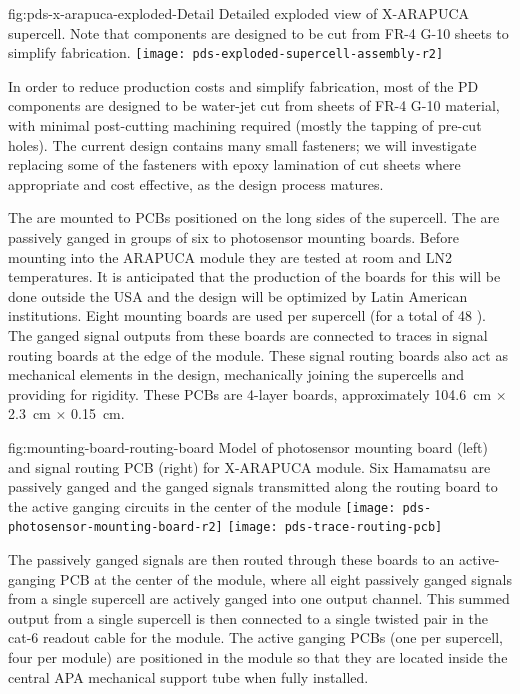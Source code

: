 
\begin{dunefigure}{fig:pds-x-arapuca-exploded-Detail}
{Detailed exploded view of X-ARAPUCA supercell. Note that components are designed to be cut from FR-4 G-10 sheets to simplify fabrication.}
   \texttt{[image: pds-exploded-supercell-assembly-r2]}
\end{dunefigure}

In order to reduce production costs and simplify fabrication, most of the PD components are designed to be water-jet cut from sheets of FR-4 G-10 material, with minimal post-cutting machining required (mostly the tapping of pre-cut holes).  The current design contains many small fasteners; we will investigate replacing some of the fasteners with epoxy lamination of cut sheets where appropriate and cost effective, as the design process matures.

The  are mounted to PCBs positioned on the long sides of the supercell.  The  are passively ganged in groups of six to photosensor mounting boards. Before mounting into the ARAPUCA module they are tested at room and LN2 temperatures. It is anticipated that the production of the boards for   this will be done outside the USA and the design will be optimized by Latin American institutions. Eight  mounting boards are used per supercell (for a total of 48 ).  The ganged signal outputs from these boards are connected to traces in signal routing boards at the edge of the module. These signal routing boards also act as mechanical elements in the design, mechanically joining the supercells and providing for rigidity.  These PCBs are 4-layer boards, approximately \SI{104.6}{cm} $\times$ \SI{2.3}{cm} $\times$ \SI{0.15}{cm}.

 \begin{dunefigure}
 {fig:mounting-board-routing-board}
{Model of photosensor mounting board (left) and signal routing PCB (right) for X-ARAPUCA module.  Six Hamamatsu  are passively ganged and the ganged signals transmitted along the routing board to the active ganging circuits in the center of the module}
  \texttt{[image: pds-photosensor-mounting-board-r2]}
  \texttt{[image: pds-trace-routing-pcb]}
\end{dunefigure}
The passively ganged signals are then routed through these boards to an active-ganging PCB at the center of the module, where all eight passively ganged signals from a single supercell are actively ganged into one output channel. This summed output from a single supercell is then connected to a single twisted pair in the cat-6 readout cable for the module.  The active ganging PCBs (one per supercell, four per module) are positioned in the module so that they are located inside the central APA mechanical support tube when fully installed.

